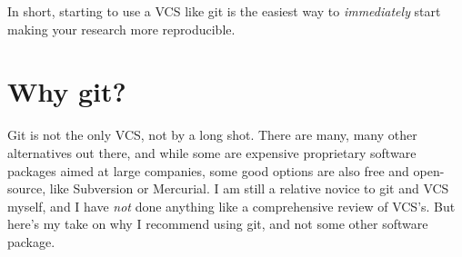 \documentclass[11pt]{article}
\begin{document}
In short, starting to use a VCS like git is the easiest way to \emph{immediately} start making your research more reproducible.
\section{Why git?}
\label{sec-4}

Git is not the only VCS, not by a long shot.  There are many, many other alternatives out there, and while some are expensive proprietary software packages aimed at large companies, some good options are also free and open-source, like Subversion or Mercurial.  I am still a relative novice to git and VCS myself, and I have \emph{not} done anything like a comprehensive review of VCS's.  But here's my take on why I recommend using git, and not some other software package.
\end{document}
